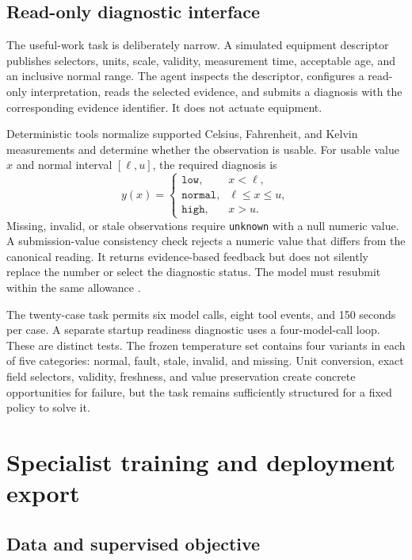 \documentclass[11pt,letterpaper]{article}
\begin{document}
\subsection{Read-only diagnostic interface}

The useful-work task is deliberately narrow. A simulated equipment descriptor
publishes selectors, units, scale, validity, measurement time, acceptable age,
and an inclusive normal range. The agent inspects the descriptor, configures
a read-only interpretation, reads the selected evidence, and submits a diagnosis
with the corresponding evidence identifier. It does not actuate equipment.

Deterministic tools normalize supported Celsius, Fahrenheit, and Kelvin
measurements and determine whether the observation is usable. For usable value
$x$ and normal interval $[\ell,u]$, the required diagnosis is
\[
y(x)=
\begin{cases}
\texttt{low},&x<\ell,\\
\texttt{normal},&\ell\leq x\leq u,\\
\texttt{high},&x>u.
\end{cases}
\]
Missing, invalid, or stale observations require \texttt{unknown} with a null
numeric value. A submission-value consistency check rejects a numeric value
that differs from the canonical reading. It returns evidence-based feedback
but does not silently replace the number or select the diagnostic status.
The model must resubmit within the same allowance \cite{implementation,cases}.

The twenty-case task permits six model calls, eight tool events, and 150 seconds
per case. A separate startup readiness diagnostic uses a four-model-call loop.
These are distinct tests. The frozen temperature set contains four variants
in each of five categories: normal, fault, stale, invalid, and missing.
Unit conversion, exact field selectors, validity, freshness, and value
preservation create concrete opportunities for failure, but the task remains
sufficiently structured for a fixed policy to solve it.

\section{Specialist training and deployment export}
\label{sec:training}

\subsection{Data and supervised objective}
\end{document}
